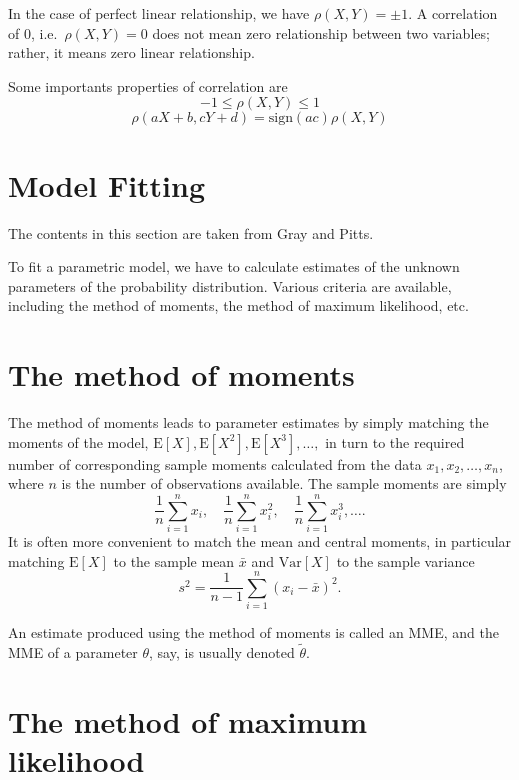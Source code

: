 \documentclass[
]{book}
\theoremstyle{definition}
\theoremstyle{definition}
\theoremstyle{definition}
\theoremstyle{definition}
\theoremstyle{remark}
\begin{document}
In the case of perfect linear relationship, we have
\(\rho(X, Y ) = \pm1\). A correlation of 0, i.e.~\(\rho(X, Y ) = 0\) does
not mean zero relationship between two variables; rather, it means zero
linear relationship.

Some importants properties of correlation are
\[-1 \le \rho(X, Y ) \le 1\]
\[\rho(a X + b, cY +d) = \text{sign}(ac) \rho(X, Y )\]

\hypertarget{model-fitting}{%
\section{Model Fitting}\label{model-fitting}}

The contents in this section are taken from Gray and Pitts.

To fit a parametric model, we have to calculate estimates of the unknown
parameters of the probability distribution. Various criteria are
available, including the method of moments, the method of maximum
likelihood, etc.

\hypertarget{the-method-of-moments}{%
\section{The method of moments}\label{the-method-of-moments}}

The method of moments leads to parameter estimates by simply matching
the moments of the model,
\(\mathrm{E}[X], \mathrm{E}[X^2], \mathrm{E}[X^3], \ldots ,\) in turn to
the required number of corresponding sample moments calculated from the
data \(x_1, x_2, \ldots , x_n\), where \(n\) is the number of observations
available. The sample moments are simply
\[\frac{1}{n}\sum_{i=1}^n x_i, \quad  \frac{1}{n}\sum_{i=1}^n  x^2_i, \quad \frac{1}{n}\sum_{i=1}^n x^3_i, \ldots.\]
It is often more convenient to match the mean and central moments, in
particular matching \(\mathrm{E}[X]\) to the sample mean \(\bar{x}\) and
\(\mathrm{Var}[X]\) to the sample variance
\[s^2 = \frac{1}{n-1}\sum_{i=1}^n (x_i - \bar{x})^2.\]

An estimate produced using the method of moments is called an MME, and
the MME of a parameter \(\theta\), say, is usually denoted
\(\tilde{\theta}\).

\hypertarget{the-method-of-maximum-likelihood}{%
\section{The method of maximum likelihood}\label{the-method-of-maximum-likelihood}}
\end{document}
